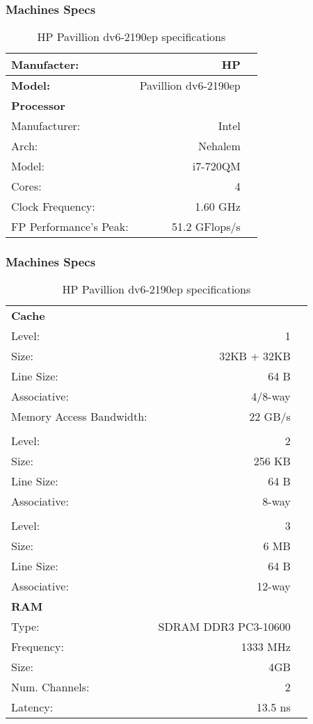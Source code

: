 \documentclass{beamer}
\begin{document}
\begin{frame}
	\frametitle{Machines Specs}
	{\small
	\begin{table}[!htp]
		\begin{tabular}{lrl}
			\hline 
			\textbf{Manufacter:} & HP \\
			\hline 
			\textbf{Model:} & Pavillion dv6-2190ep \\
			\hline 
			\textbf{Processor} & & \\
			Manufacturer: & Intel & \\
			Arch: & Nehalem & \\
			Model: & i7-720QM & \\
			Cores: & 4 & \\
			Clock Frequency: & 1.60 GHz & \\
			FP Performance's Peak: & 51.2 GFlops/s & \\
			\hline 
			\end{tabular}
		\caption{HP Pavillion dv6-2190ep specifications}
		\label{tab:mbp}
\end{table}
}
\end{frame}
			\begin{frame}
	\frametitle{Machines Specs}
	{\small
	\begin{table}[!htp]
		\begin{tabular}{lrl}
		\hline
			\textbf{Cache} & & \\
			Level: & 1 & \\
			Size: & 32KB + 32KB & \\
			Line Size: & 64 B & \\
			Associative: & 4/8-way & \\
			Memory Access Bandwidth: & 22 GB/s & \\
			\\
			Level: & 2 & \\
			Size: & 256 KB & \\
			Line Size: & 64 B & \\
			Associative: & 8-way & \\
			\\
			Level: & 3 & \\
			Size: & 6 MB & \\
			Line Size: & 64 B & \\
			Associative: & 12-way & \\
			\hline 
			\textbf{RAM} \\
			Type: & SDRAM DDR3 PC3-10600 & \\
			Frequency: & 1333 MHz & \\
			Size: & 4GB & \\
			Num. Channels: & 2 & \\
			Latency: & 13.5 ns & \\
		\end{tabular}
		\caption{HP Pavillion dv6-2190ep specifications}
		\label{tab:mbp}
\end{table}
}
\end{frame}
\end{document}
